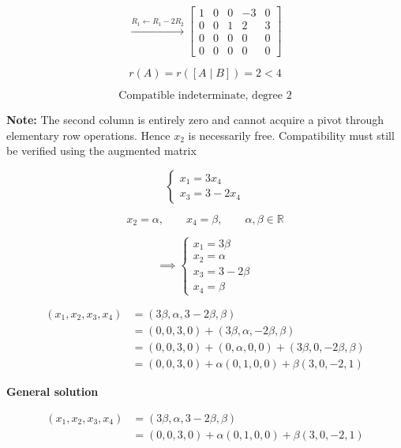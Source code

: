 \begin{answer}
    $$
    \xrightarrow{R_1\leftarrow R_1-2R_2}
    \left[
    \begin{array}{cccc|c}
    1&0&0&-3&0\\
    0&0&1&2&3\\
    0&0&0&0&0\\
    0&0&0&0&0
    \end{array}
    \right]
    $$

    $$
    r(A)=r([A\mid B])=2<4
    $$

    $$
    \boxed{
    \text{Compatible indeterminate, degree }2
    }
    $$

    {\color{red}
    \textbf{Note:} The second column is
    entirely zero and cannot acquire a
    pivot through elementary row operations.
    Hence $x_2$ is necessarily free.
    Compatibility must still be verified
    using the augmented matrix
    }

    
    $$
    \begin{cases}
        x_1=3x_4\\
        x_3=3-2x_4
    \end{cases}
    $$

    $$
    x_2=\alpha,\qquad
    x_4=\beta,\qquad
    \alpha,\beta\in\mathbb R
    $$

    $$
    \implies
    \begin{cases}
        x_1=3\beta\\
        x_2=\alpha\\
        x_3=3-2\beta\\
        x_4=\beta
    \end{cases}
    $$

    $$
    \begin{aligned}
    (x_1,x_2,x_3,x_4)
    &=(3\beta,\alpha,3-2\beta,\beta)\\
    &=(0,0,3,0)+(3\beta,\alpha,-2\beta,\beta)\\
    &=(0,0,3,0)
    +(0,\alpha,0,0)
    +(3\beta,0,-2\beta,\beta)\\
    &=(0,0,3,0)
    +\alpha(0,1,0,0)
    +\beta(3,0,-2,1)
    \end{aligned}
    $$


    \textbf{General solution}

    $$
    \begin{aligned}
    (x_1,x_2,x_3,x_4)
    &=(3\beta,\alpha,3-2\beta,\beta)\\
    &=(0,0,3,0)
      +\alpha(0,1,0,0)
      +\beta(3,0,-2,1)
    \end{aligned}
    $$


\end{answer}

